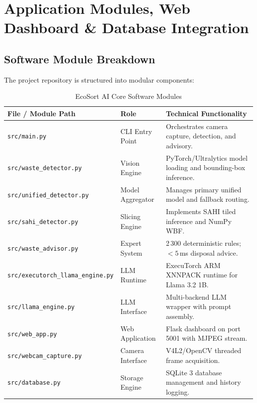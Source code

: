 \documentclass[12pt,a4paper]{article}
\begin{document}
\clearpage

\section{Application Modules, Web Dashboard \& Database Integration}

\subsection{Software Module Breakdown}

The project repository is structured into modular components:

\begin{table}[H]
\centering
\caption{EcoSort AI Core Software Modules}\label{tab:modules}
\begin{tabular}{llp{7.5cm}}
\toprule
\textbf{File / Module Path} & \textbf{Role} & \textbf{Technical Functionality} \\
\midrule
\texttt{src/main.py}                 & CLI Entry Point    & Orchestrates camera capture, detection, and advisory. \\
\texttt{src/waste\_detector.py}      & Vision Engine      & PyTorch/Ultralytics model loading and bounding-box inference. \\
\texttt{src/unified\_detector.py}    & Model Aggregator   & Manages primary unified model and fallback routing. \\
\texttt{src/sahi\_detector.py}       & Slicing Engine     & Implements SAHI tiled inference and NumPy WBF. \\
\texttt{src/waste\_advisor.py}       & Expert System      & 2\,300 deterministic rules; $<5$\,ms disposal advice. \\
\texttt{src/executorch\_llama\_engine.py} & LLM Runtime & ExecuTorch ARM XNNPACK runtime for Llama 3.2 1B. \\
\texttt{src/llama\_engine.py}        & LLM Interface      & Multi-backend LLM wrapper with prompt assembly. \\
\texttt{src/web\_app.py}             & Web Application    & Flask dashboard on port 5001 with MJPEG stream. \\
\texttt{src/webcam\_capture.py}      & Camera Interface   & V4L2/OpenCV threaded frame acquisition. \\
\texttt{src/database.py}             & Storage Engine     & SQLite 3 database management and history logging. \\
\bottomrule
\end{tabular}
\end{table}
\end{document}
